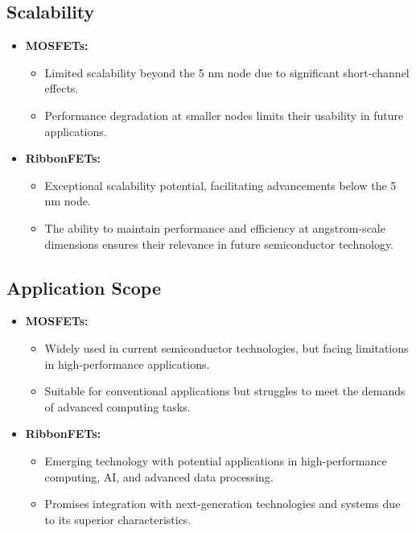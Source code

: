 \documentclass[12pt]{report}
\begin{document}
\begin{titlepage}
\subsection{Scalability}

\begin{itemize}
    \item \textbf{MOSFETs:} 
    \begin{itemize}
        \item Limited scalability beyond the 5 nm node due to significant short-channel effects.
        \item Performance degradation at smaller nodes limits their usability in future applications.
    \end{itemize}
    
    \item \textbf{RibbonFETs:} 
    \begin{itemize}
        \item Exceptional scalability potential, facilitating advancements below the 5 nm node.
        \item The ability to maintain performance and efficiency at angstrom-scale dimensions ensures their relevance in future semiconductor technology.
    \end{itemize}
\end{itemize}

\subsection{Application Scope}

\begin{itemize}
    \item \textbf{MOSFETs:} 
    \begin{itemize}
        \item Widely used in current semiconductor technologies, but facing limitations in high-performance applications.
        \item Suitable for conventional applications but struggles to meet the demands of advanced computing tasks.
    \end{itemize}
    
    \item \textbf{RibbonFETs:} 
    \begin{itemize}
        \item Emerging technology with potential applications in high-performance computing, AI, and advanced data processing.
        \item Promises integration with next-generation technologies and systems due to its superior characteristics.
    \end{itemize}
\end{itemize}


\end{titlepage}
\end{document}
